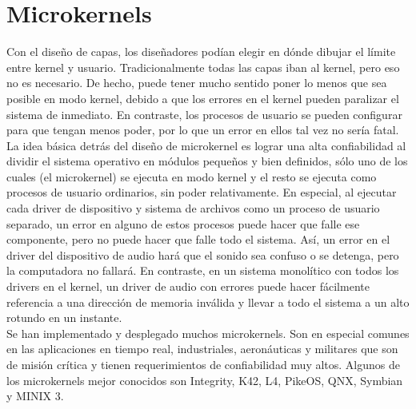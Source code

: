 \documentclass[10pt,a4paper,spanish]{report}
\begin{document}
  \section{Microkernels}

  Con el diseño de capas, los diseñadores podían elegir en dónde dibujar el límite entre kernel y usuario. Tradicionalmente todas las capas iban al kernel, pero eso no es necesario. De hecho, puede tener mucho sentido poner lo menos que sea posible en modo kernel, debido a que los errores en el kernel pueden paralizar el sistema de inmediato. En contraste, los procesos de usuario se pueden configurar para que tengan menos poder, por lo que un error en ellos tal vez no sería fatal. \\

  \noindent
  La idea básica detrás del diseño de microkernel es lograr una alta confiabilidad al dividir el sistema operativo en módulos pequeños y bien definidos, sólo uno de los cuales (el microkernel) se ejecuta en modo kernel y el resto se ejecuta como procesos de usuario ordinarios, sin poder relativamente. En especial, al ejecutar cada driver de dispositivo y sistema de archivos como un proceso de usuario separado, un error en alguno de estos procesos puede hacer que falle ese componente, pero no puede hacer que falle todo el sistema. Así, un error en el driver del dispositivo de audio hará que el sonido sea confuso o se detenga, pero la computadora no fallará. En contraste, en un sistema monolítico con todos los drivers en el kernel, un driver de audio con errores puede hacer fácilmente referencia a una dirección de memoria inválida y llevar a todo el sistema a un alto rotundo en un instante. \\

  \noindent
  Se han implementado y desplegado muchos microkernels. Son en especial comunes en las aplicaciones en tiempo real, industriales, aeronáuticas y militares que son de misión crítica y tienen requerimientos de confiabilidad muy altos. Algunos de los microkernels mejor conocidos son Integrity, K42, L4, PikeOS, QNX, Symbian y MINIX 3. \\
\end{document}
